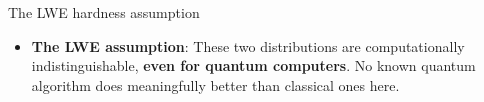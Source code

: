 \ifdefined\PRESENTATION\else\PassOptionsToClass{handout}{beamer}\fi\documentclass[aspectratio=169, lualatex]{beamer}
\begin{document}
\begin{frame}{The LWE hardness assumption}
	\begin{center}
	\end{center}
	\vspace{5mm}
	\begin{itemize}
		\item \textbf{The LWE assumption}: These two distributions are computationally indistinguishable, \textbf{even for quantum computers}. No known quantum algorithm does meaningfully better than classical ones here.
	\end{itemize}
\end{frame}
\end{document}
